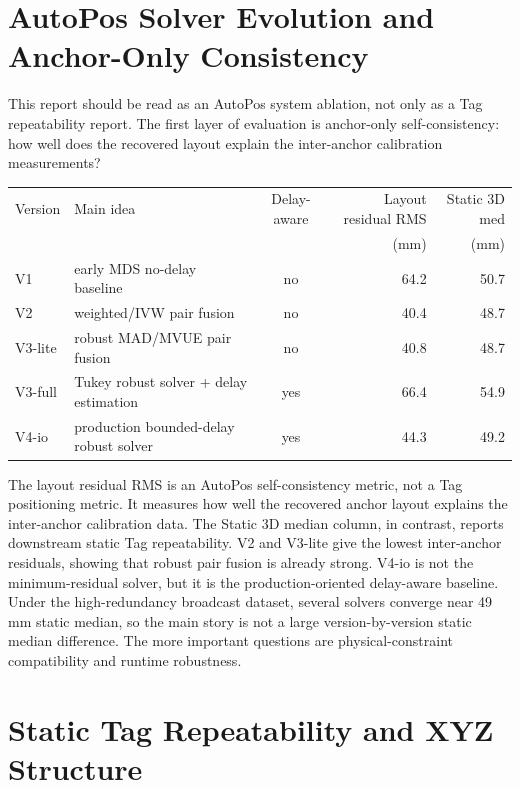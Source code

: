 \documentclass[11pt]{article}
\begin{document}
\section{AutoPos Solver Evolution and Anchor-Only Consistency}

This report should be read as an AutoPos system ablation, not only as a Tag repeatability report. The first layer of evaluation is anchor-only self-consistency: how well does the recovered layout explain the inter-anchor calibration measurements?

\begin{center}
\small
\setlength{\tabcolsep}{4pt}
\begin{tabular}{l l c r r}
\toprule
Version & Main idea & Delay-aware & Layout residual RMS & Static 3D med \\
 & & & (mm) & (mm) \\
\midrule
V1 & early MDS no-delay baseline & no & 64.2 & 50.7 \\
V2 & weighted/IVW pair fusion & no & 40.4 & 48.7 \\
V3-lite & robust MAD/MVUE pair fusion & no & 40.8 & 48.7 \\
V3-full & Tukey robust solver + delay estimation & yes & 66.4 & 54.9 \\
V4-io & production bounded-delay robust solver & yes & 44.3 & 49.2 \\
\bottomrule
\end{tabular}
\end{center}

The layout residual RMS is an AutoPos self-consistency metric, not a Tag positioning metric. It measures how well the recovered anchor layout explains the inter-anchor calibration data. The Static 3D median column, in contrast, reports downstream static Tag repeatability. V2 and V3-lite give the lowest inter-anchor residuals, showing that robust pair fusion is already strong. V4-io is not the minimum-residual solver, but it is the production-oriented delay-aware baseline. Under the high-redundancy broadcast dataset, several solvers converge near 49 mm static median, so the main story is not a large version-by-version static median difference. The more important questions are physical-constraint compatibility and runtime robustness.

\section{Static Tag Repeatability and XYZ Structure}
\end{document}
